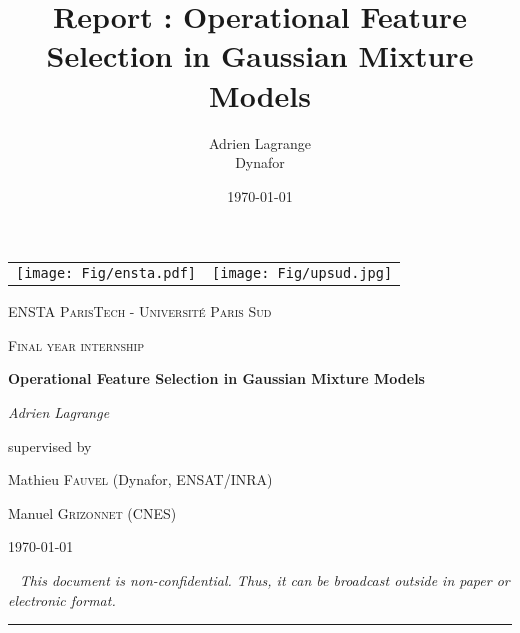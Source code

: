 \documentclass[a4paper,11pt,DIV=16,abstracton]{scrartcl}
\title{Report : Operational Feature Selection in Gaussian Mixture Models}
\author{Adrien Lagrange
\\
\small{Dynafor}}
\date{\today}
\newcommand\blankpage{%
    \null
    \thispagestyle{empty}%
    \newpage}
\begin{document}

\begin{titlepage}
    \centering
    \begin{tabular}{cc}
        \texttt{[image: Fig/ensta.pdf]}\par\vspace{1cm} &
        \texttt{[image: Fig/upsud.jpg]}\par\vspace{1cm} \\
    \end{tabular}

    {\scshape\LARGE ENSTA ParisTech - Université Paris Sud \par}
    \vspace{1cm}
    {\scshape\Large Final year internship\par}
    \vspace{1.5cm}
    {\huge\bfseries Operational Feature Selection in Gaussian Mixture Models\par}
    \vspace{2cm}
    {\Large\itshape Adrien Lagrange\par}
    \vfill
    supervised by\par
    Mathieu \textsc{Fauvel} (Dynafor, ENSAT/INRA)\par
    Manuel \textsc{Grizonnet} (CNES)

    \vfill

    {\large \today\par}

\end{titlepage}

\thispagestyle{empty}
\mbox{~}
\vfill
{\color{red}\Large\itshape This document is non-confidential. Thus, it can be broadcast outside in paper or electronic format.}
\newpage

\noindent\rule{\textwidth}{1.5pt}
\end{document}
